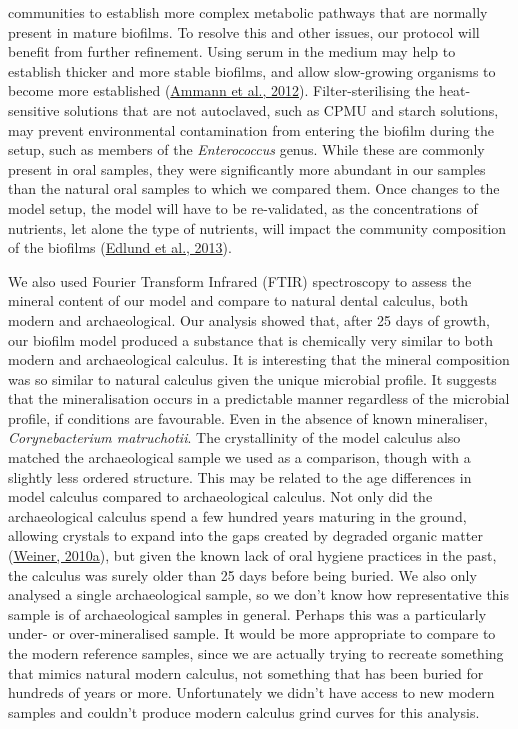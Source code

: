 \documentclass[
  letterpaper,
]{book}
\begin{document}
communities to establish more complex metabolic pathways that are
normally present in mature biofilms. To resolve this and other issues,
our protocol will benefit from further refinement. Using serum in the
medium may help to establish thicker and more stable biofilms, and allow
slow-growing organisms to become more established
(\protect\hyperlink{ref-ammannZurichBiofilm2012}{Ammann et al., 2012}).
Filter-sterilising the heat-sensitive solutions that are not autoclaved,
such as CPMU and starch solutions, may prevent environmental
contamination from entering the biofilm during the setup, such as
members of the \emph{Enterococcus} genus. While these are commonly
present in oral samples, they were significantly more abundant in our
samples than the natural oral samples to which we compared them. Once
changes to the model setup, the model will have to be re-validated, as
the concentrations of nutrients, let alone the type of nutrients, will
impact the community composition of the biofilms
(\protect\hyperlink{ref-edlundBiofilmModel2013}{Edlund et al., 2013}).

We also used Fourier Transform Infrared (FTIR) spectroscopy to assess
the mineral content of our model and compare to natural dental calculus,
both modern and archaeological. Our analysis showed that, after 25 days
of growth, our biofilm model produced a substance that is chemically
very similar to both modern and archaeological calculus. It is
interesting that the mineral composition was so similar to natural
calculus given the unique microbial profile. It suggests that the
mineralisation occurs in a predictable manner regardless of the
microbial profile, if conditions are favourable. Even in the absence of
known mineraliser, \emph{Corynebacterium matruchotii}. The crystallinity
of the model calculus also matched the archaeological sample we used as
a comparison, though with a slightly less ordered structure. This may be
related to the age differences in model calculus compared to
archaeological calculus. Not only did the archaeological calculus spend
a few hundred years maturing in the ground, allowing crystals to expand
into the gaps created by degraded organic matter
(\protect\hyperlink{ref-weinerBiologicalMaterials2010}{Weiner, 2010a}),
but given the known lack of oral hygiene practices in the past, the
calculus was surely older than 25 days before being buried. We also only
analysed a single archaeological sample, so we don't know how
representative this sample is of archaeological samples in general.
Perhaps this was a particularly under- or over-mineralised sample. It
would be more appropriate to compare to the modern reference samples,
since we are actually trying to recreate something that mimics natural
modern calculus, not something that has been buried for hundreds of
years or more. Unfortunately we didn't have access to new modern samples
and couldn't produce modern calculus grind curves for this analysis.
\end{document}
